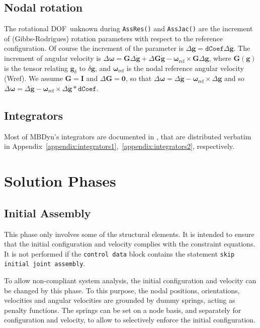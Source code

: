 \documentclass[10pt,fleqn,subeqn]{report}
\newcommand{\T}[1]{\bm{#1}}
\newcommand{\dof}{DOF}
\begin{document}
\section{Nodal rotation}
\label{sec:NodalRotation}
The rotational \dof\ unknown during \texttt{AssRes()} and \texttt{AssJac()}
are the increment of (Gibbs-Rodrigues) rotation parameters
with respect to the reference configuration.
Of course the increment of the parameter is
$\Delta \T g=\texttt{dCoef}\Delta \dot{\T g}$.
The increment of angular velocity is 
$\Delta \T \omega = \T G\Delta \dot{\T g}+ \Delta \T G \dot{\T g}-
\T \omega_{\mathrm{ref}}\times \T G \Delta \T g$,
where $\T G(\T g)$ is the tensor relating $\T g_\delta$ to $\delta \T g$,
and $\T \omega_{\mathrm{ref}}$ is the nodal reference angular velocity (Wref).
We assume $\T G = \T I$ and $\Delta \T G = \T 0$,
so that $\Delta \T \omega = \Delta \dot{\T g}-\T \omega_{\mathrm{ref}}\times\Delta \T g$
and so $\Delta \T \omega = \Delta \dot{\T g}-
\T \omega_{\mathrm{ref}}\times\Delta \dot{\T g} * \texttt{dCoef}$.

\section{Integrators}
Most of MBDyn's integrators are documented in \cite{zhang_optimization_2020, zhang_performance_2022}, 
that are distributed verbatim in Appendix~\ref{appendix:integrators1},~\ref{appendix:integrators2},
respectively.

\chapter{Solution Phases}
\section{Initial Assembly}
This phase only involves some of the structural elements.
It is intended to ensure that the initial configuration and velocity 
complies with the constraint equations.
It is not performed if the \texttt{control data} block contains 
the statement \texttt{skip initial joint assembly}.

To allow non-compliant system analysis, the initial configuration 
and velocity can be changed by this phase.
To this purpose, the nodal positions, orientations, velocities
and angular velocities are grounded by dummy springs, acting 
as penalty functions.
The springs can be set on a node basis, and separately 
for configuration and velocity, to allow to selectively enforce 
the initial configuration.
\end{document}
